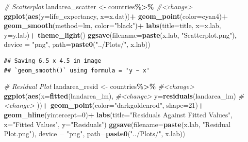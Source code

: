 \documentclass[
]{article}
\newenvironment{Shaded}{\begin{snugshade}}{\end{snugshade}}
\newcommand{\AttributeTok}[1]{\textcolor[rgb]{0.13,0.29,0.53}{#1}}
\newcommand{\CommentTok}[1]{\textcolor[rgb]{0.56,0.35,0.01}{\textit{#1}}}
\newcommand{\DecValTok}[1]{\textcolor[rgb]{0.00,0.00,0.81}{#1}}
\newcommand{\FunctionTok}[1]{\textcolor[rgb]{0.13,0.29,0.53}{\textbf{#1}}}
\newcommand{\NormalTok}[1]{#1}
\newcommand{\OtherTok}[1]{\textcolor[rgb]{0.56,0.35,0.01}{#1}}
\newcommand{\SpecialCharTok}[1]{\textcolor[rgb]{0.81,0.36,0.00}{\textbf{#1}}}
\newcommand{\StringTok}[1]{\textcolor[rgb]{0.31,0.60,0.02}{#1}}
\begin{document}
\begin{Shaded}
\begin{Highlighting}[]
\CommentTok{\# Scatterplot}
\NormalTok{landarea\_scatter }\OtherTok{\textless{}{-}}\NormalTok{ countries}\SpecialCharTok{\%\textgreater{}\%} \CommentTok{\#\textless{}change\textgreater{}}
  \FunctionTok{ggplot}\NormalTok{(}\FunctionTok{aes}\NormalTok{(}\AttributeTok{y=}\NormalTok{life\_expectancy, }
             \AttributeTok{x=}\NormalTok{x.dat))}\SpecialCharTok{+}
  \FunctionTok{geom\_point}\NormalTok{(}\AttributeTok{color=}\StringTok{\textquotesingle{}cyan4\textquotesingle{}}\NormalTok{)}\SpecialCharTok{+}
  \FunctionTok{geom\_smooth}\NormalTok{(}\AttributeTok{method=}\StringTok{\textquotesingle{}lm\textquotesingle{}}\NormalTok{, }\AttributeTok{color=}\StringTok{"black"}\NormalTok{)}\SpecialCharTok{+}
  \FunctionTok{labs}\NormalTok{(}\AttributeTok{title=}\NormalTok{title,}
       \AttributeTok{x=}\NormalTok{x.lab,}
       \AttributeTok{y=}\NormalTok{y.lab)}\SpecialCharTok{+}
  \FunctionTok{theme\_light}\NormalTok{()}
\FunctionTok{ggsave}\NormalTok{(}\AttributeTok{filename=}\FunctionTok{paste}\NormalTok{(x.lab, }\StringTok{"Scatterplot.png"}\NormalTok{), }\AttributeTok{device =} \StringTok{"png"}\NormalTok{, }\AttributeTok{path=}\FunctionTok{paste0}\NormalTok{(}\StringTok{"../Plots/"}\NormalTok{, x.lab))}
\end{Highlighting}
\end{Shaded}

\begin{verbatim}
## Saving 6.5 x 4.5 in image
## `geom_smooth()` using formula = 'y ~ x'
\end{verbatim}

\begin{Shaded}
\begin{Highlighting}[]
\CommentTok{\# Residual Plot}
\NormalTok{landarea\_resid }\OtherTok{\textless{}{-}}\NormalTok{ countries}\SpecialCharTok{\%\textgreater{}\%}  \CommentTok{\#\textless{}change\textgreater{}}
  \FunctionTok{ggplot}\NormalTok{(}\FunctionTok{aes}\NormalTok{(}\AttributeTok{x=}\FunctionTok{fitted}\NormalTok{(landarea\_lm), }\CommentTok{\#\textless{}change\textgreater{}}
             \AttributeTok{y=}\FunctionTok{residuals}\NormalTok{(landarea\_lm) }\CommentTok{\#\textless{}change\textgreater{}}
\NormalTok{             ))}\SpecialCharTok{+}
  \FunctionTok{geom\_point}\NormalTok{(}\AttributeTok{color=}\StringTok{"darkgoldenrod"}\NormalTok{, }\AttributeTok{shape=}\DecValTok{21}\NormalTok{)}\SpecialCharTok{+}
  \FunctionTok{geom\_hline}\NormalTok{(}\AttributeTok{yintercept=}\DecValTok{0}\NormalTok{)}\SpecialCharTok{+}
  \FunctionTok{labs}\NormalTok{(}\AttributeTok{title=}\StringTok{"Residuals Against Fitted Values"}\NormalTok{,}
       \AttributeTok{x=}\StringTok{"Fitted Values"}\NormalTok{,}
       \AttributeTok{y=}\StringTok{"Residuals"}\NormalTok{)}
\FunctionTok{ggsave}\NormalTok{(}\AttributeTok{filename=}\FunctionTok{paste}\NormalTok{(x.lab, }\StringTok{"Residual Plot.png"}\NormalTok{), }\AttributeTok{device =} \StringTok{"png"}\NormalTok{, }\AttributeTok{path=}\FunctionTok{paste0}\NormalTok{(}\StringTok{"../Plots/"}\NormalTok{, x.lab))}
\end{Highlighting}
\end{Shaded}
\end{document}
